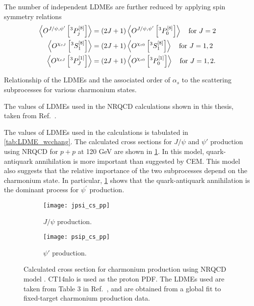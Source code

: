 \documentclass[../main.tex]{subfiles}
\begin{document}
The number of independent LDMEs are further reduced by applying spin symmetry relations
\begin{equation}
	\begin{split}
		\expval{O^{J/\psi,\psi'}\left[^3P_j^{\left[8\right]}\right]} & = \left(2J+1\right)\expval{O^{J/\psi,\psi'}\left[^3P_0^{\left[8\right]}\right]} \quad \text{for }J=2 \\
		\expval{O^{\chi_{cJ}}\left[^3S_1^{\left[8\right]}\right]}    & = \left(2J+1\right)\expval{O^{\chi_{c0}}\left[^3S_1^{\left[8\right]}\right]} \quad \text{for }J=1,2  \\
		\expval{O^{\chi_{cJ}}\left[^3P_J^{\left[1\right]}\right]}    & = \left(2J+1\right)\expval{O^{\chi_{c0}}\left[^3P_0^{\left[1\right]}\right]} \quad \text{for }J=1,2.
	\end{split}
\end{equation}
\begin{table}[h!]
	\centering
	\caption{Relationship of the LDMEs and the associated order of $\alpha_s$ to
		the scattering subprocesses for various charmonium states.}
	\label{tab:LDME_order}
	
\end{table}
\begin{table}[h!]
	\centering
	\caption{The values of LDMEs used in the NRQCD calculations shown in this thesis,
		taken from Ref.~\cite{chang2023}.}
	\label{tab:LDME_wcchang}
	
\end{table}

The values of LDMEs used in the calculations is tabulated in \cref{tab:LDME_wcchang}.
The calculated cross sections for $J/\psi$ and $\psi'$ production using NRQCD for
$p+p$ at 120 GeV are shown in \cref{fig:NRQCD_cs}. In this model, quark-antiquark
annihilation is more important than suggested by CEM. This model also suggests
that the relative importance of the two subprocesses depend on the charmonium state.
In particular, \cref{fig:NRQCD_cs} shows that the quark-antiquark annihilation
is the dominant process for $\psi^\prime$ production.
\begin{figure}[h!]
	\centering
	\begin{subfigure}{0.45\linewidth}
		\texttt{[image: jpsi\_cs\_pp]}
		\caption{$J/\psi$ production.}
	\end{subfigure}
	\quad
	\begin{subfigure}{0.45\linewidth}
		\texttt{[image: psip\_cs\_pp]}
		\caption{$\psi'$ production.}
	\end{subfigure}
	\caption{Calculated cross section for charmonium production using NRQCD model
		\cite{chang2021}. CT14nlo is used as the proton PDF. The LDMEs used are
		taken from Table \num{3} in Ref.~\cite{chang2023}, and are obtained from a
		global fit to fixed-target charmonium production data. }
	\label{fig:NRQCD_cs}
\end{figure}



\ifSubfilesClassLoaded{ \printbibliography[heading=bibintoc,title={References}]}{}
\end{document}
